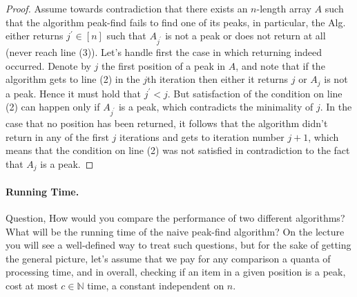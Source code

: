 \begin{proof}
%
%
Assume towards contradiction that there exists an $n$-length array $A$ such that the algorithm peak-find fails to find one of its peaks, in particular, the Alg. either returns $j^{\prime}\in [n]$ such that $A_{j^{\prime}}$ is not a peak or does not return at all (never reach line (3)). Let's handle first the case in which returning indeed occurred. Denote by $j$ the first position of a peak in $A$, and note that if the algorithm gets to line (2) in the $j$th iteration then either it returns $j$ or $A_{j}$ is not a peak.
  Hence it must hold that $j^{\prime} < j$. But satisfaction of the condition on line (2) can happen only if $A_{j^{\prime}}$ is a peak, which contradicts the minimality of $j$. In the case that no position has been returned, it follows that the algorithm didn't return in any of the first $j$ iterations and gets to iteration number $j+1$, which means that the condition on line (2) was not satisfied in contradiction to the fact that $A_{j}$ is a peak.
\end{proof}

\paragraph{Running Time.} 
Question, How would you compare the performance of two different algorithms? What will be the running time of the naive peak-find algorithm? On the lecture you will see a well-defined way to treat such questions, but for the sake of getting the general picture, let's assume that we pay for any comparison a quanta of processing time, and in overall, checking if an item in a given position is a peak, cost at most $c\in \mathbb{N}$ time, a constant independent on $n$.


